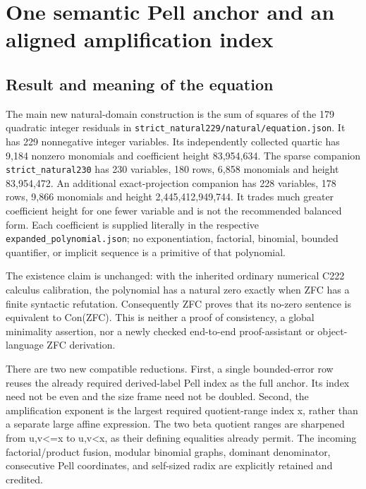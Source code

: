 \section{One semantic Pell anchor and an aligned amplification index}



\subsection{Result and meaning of the equation}



The main new natural-domain construction is the sum of squares of the 179 quadratic integer residuals in \texttt{strict\_\allowbreak{}natural229/\allowbreak{}natural/\allowbreak{}equation.json}. It has 229 nonnegative integer variables. Its independently collected quartic has 9,184 nonzero monomials and coefficient height 83,954,634. The sparse companion \texttt{strict\_\allowbreak{}natural230} has 230 variables, 180 rows, 6,858 monomials and height 83,954,472. An additional exact-projection companion has 228 variables, 178 rows, 9,866 monomials and height 2,445,412,949,744. It trades much greater coefficient height for one fewer variable and is not the recommended balanced form. Each coefficient is supplied literally in the respective \texttt{expanded\_\allowbreak{}polynomial.json}; no exponentiation, factorial, binomial, bounded quantifier, or implicit sequence is a primitive of that polynomial.



The existence claim is unchanged: with the inherited ordinary numerical C222 calculus calibration, the polynomial has a natural zero exactly when ZFC has a finite syntactic refutation. Consequently ZFC proves that its no-zero sentence is equivalent to Con(ZFC). This is neither a proof of consistency, a global minimality assertion, nor a newly checked end-to-end proof-assistant or object-language ZFC derivation.



There are two new compatible reductions. First, a single bounded-error row reuses the already required derived-label Pell index as the full anchor. Its index need not be even and the size frame need not be doubled. Second, the amplification exponent is the largest required quotient-range index x, rather than a separate large affine expression. The two beta quotient ranges are sharpened from u,v\textless{}\allowbreak{}=\allowbreak{}x to u,v\textless{}\allowbreak{}x, as their defining equalities already permit. The incoming factorial/\allowbreak{}product fusion, modular binomial graphs, dominant denominator, consecutive Pell coordinates, and self-sized radix are explicitly retained and credited.



